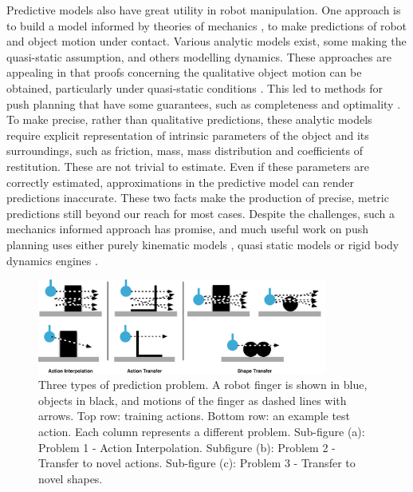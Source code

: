 Predictive models also have great utility in robot manipulation. One approach is to build a model informed by theories of mechanics \citep{mason_manipulator_1982,lynch_mechanics_1992,lynchmason96,peshkin_motion_1988,cappelleri_designing_2006,mason_mechanics_2001,flickinger2015},  to make predictions of robot and object motion under contact. Various analytic models exist, some making the quasi-static assumption, and others modelling dynamics. These approaches are appealing in that proofs concerning the qualitative object motion can be obtained, particularly under quasi-static conditions \citep{mason1985robot,peshkin_motion_1988}. This led to methods for push planning that have some guarantees, such as completeness and optimality \citep{lynchmason96}. To make precise, rather than qualitative predictions, these analytic models require explicit representation of intrinsic parameters of the object and its surroundings, such as friction, mass, mass distribution and coefficients of restitution. These are not trivial to estimate. Even if these parameters are correctly estimated, approximations in the predictive model can render predictions inaccurate. These two facts make the production of precise, metric predictions still beyond our reach for most cases. Despite the challenges, such a mechanics informed approach has promise, and much useful work on push planning uses either purely kinematic models \citep{stillman08ijrr}, quasi static models \citep{Dogar_2010,lynchmason96} or rigid body dynamics engines \cite{zitoetal-iros12,Cosgun2011}. 
\def\stackalignment{l}
\begin{figure}[t]
\centerline{\includegraphics[width=0.85\textwidth]{three-prediction-problems}}
\caption{Three types of prediction problem. A robot finger is shown in blue, objects in black, and motions of the finger as dashed lines with arrows. Top row: training actions. Bottom row: an example test action. Each column represents a different problem. Sub-figure (a): Problem 1 - Action Interpolation. Subfigure (b): Problem 2 - Transfer to novel actions. Sub-figure (c): Problem 3 - Transfer to novel shapes. \label{fig:three-prediction-problems}}
\end{figure}
